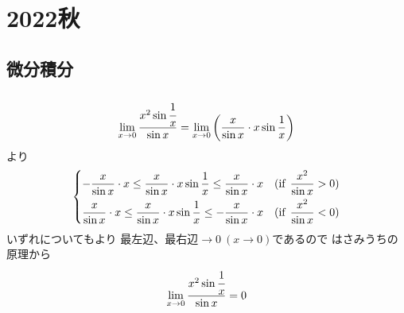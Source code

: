 \section{2022秋}

\setcounter{yearcounter}{2022}


\subsection{微分積分}
\begin{ans*}
  ${}$
  \begin{gather}
    \lim_{x\to 0}\frac{x^2\sin\cfrac{1}{x}}{\sin x}
    = \lim_{x\to 0}\left(\frac{x}{\sin x}\cdot x\sin\frac{1}{x}\right)
  \end{gather}
  より
  \begin{gather}
    \begin{dcases}
      -\frac{x}{\sin x}\cdot x
      \leq \frac{x}{\sin x}\cdot x\sin\frac{1}{x}
      \leq \frac{x}{\sin x}\cdot x
      & (\text{if\:\:} \frac{x^2}{\sin x} > 0) \\
      \frac{x}{\sin x}\cdot x
      \leq \frac{x}{\sin x}\cdot x\sin\frac{1}{x}
      \leq -\frac{x}{\sin x}\cdot x
      & (\text{if\:\:} \frac{x^2}{\sin x} < 0)
    \end{dcases}
  \end{gather}
  いずれについてもより
  最左辺、最右辺$\longrightarrow 0\:(x\to 0)$であるので
  はさみうちの原理から
  \begin{gather}
    \lim_{x\to 0}\frac{x^2 \sin \cfrac{1}{x}}{\sin x} = 0
  \end{gather}
\end{ans*}


